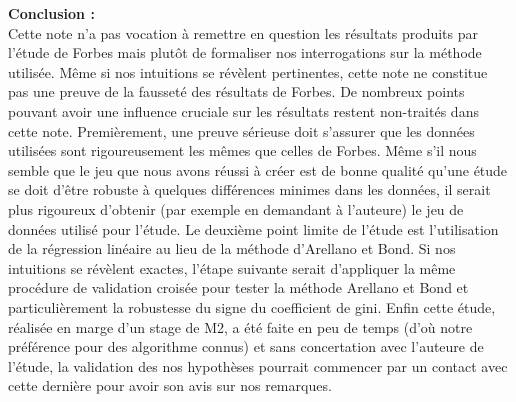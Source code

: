 \documentclass[11pt,a4paper]{article}
\begin{document}
\newpage

\noindent
\textbf{Conclusion :}\\

Cette note n'a pas vocation à remettre en question les résultats produits par l'étude de Forbes mais plutôt de formaliser nos interrogations sur la méthode utilisée. Même si nos intuitions se révèlent pertinentes, cette note ne constitue pas une preuve de la fausseté des résultats de Forbes. De nombreux points pouvant avoir une influence cruciale sur les résultats restent non-traités dans cette note. Premièrement, une preuve sérieuse doit s'assurer que les données utilisées sont rigoureusement les mêmes que celles de Forbes. Même s'il nous semble que le jeu que nous avons réussi à créer est de bonne qualité qu'une étude se doit d'être robuste à quelques différences minimes dans les données, il serait plus rigoureux d'obtenir (par exemple en demandant à l'auteure) le jeu de données utilisé pour l'étude. Le deuxième point limite de l'étude est l'utilisation de la régression linéaire au lieu de la méthode d'Arellano et Bond. Si nos intuitions se révèlent exactes, l'étape suivante serait d'appliquer la même procédure de validation croisée pour tester la méthode Arellano et Bond et particulièrement la robustesse du signe du coefficient de gini. Enfin cette étude, réalisée en marge d'un stage de M2, a été faite en peu de temps (d'où notre préférence pour des algorithme connus) et sans concertation avec l'auteure de l'étude, la validation des nos hypothèses pourrait commencer par un contact avec cette dernière pour avoir son avis sur nos remarques. 
\end{document}
